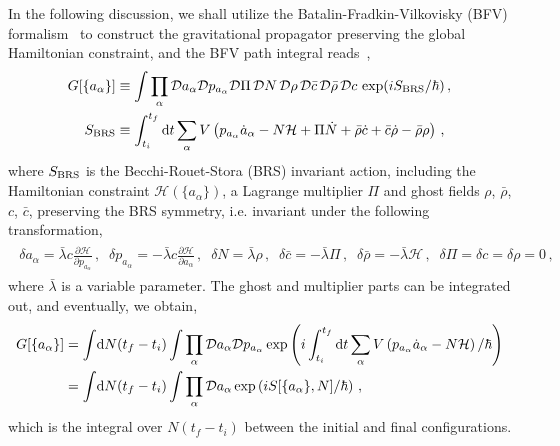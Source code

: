\documentclass[superscriptaddress,aps,preprintnumbers,nofootinbib]{revtex4-2}
\begin{document}
In the following discussion, we shall utilize the Batalin-Fradkin-Vilkovisky (BFV) formalism~\cite{Fradkin:1975cq,Batalin:1977pb} to construct the gravitational propagator preserving the global Hamiltonian constraint, and the BFV path integral reads~\cite{Halliwell:1988wc},
\begin{align}
G[\{a_{\alpha}\}]&\equiv \int \prod_{\alpha} \mathcal{D}a_{\alpha}\mathcal{D}p_{a_{\alpha}}\mathcal{D}\Pi\,\mathcal{D}N\,\mathcal{D}\rho\,\mathcal{D}\bar{c}\,\mathcal{D}\bar\rho\,\mathcal{D}c\,\exp(iS_{\rm BRS}/\hbar)\,,\\
S_{\rm BRS}&\equiv \int_{t_i}^{t_f} {\rm d}t 
\sum_{\alpha}V \left(p_{a_{\alpha}}\dot{a}_{\alpha}- N \mathcal{H} + \Pi \dot{N} +\bar\rho\dot{c} +\bar{c}\dot\rho-\bar\rho\rho\right)\,,
\end{align}
where $S_{\rm BRS}$ is the Becchi-Rouet-Stora (BRS) invariant action, including the Hamiltonian constraint $\mathcal{H}(\{a_{\alpha}\})$, a Lagrange multiplier $\Pi$ and ghost fields $\rho$, $\bar{\rho}$, $c$, $\bar{c}$, preserving the BRS symmetry, i.e. invariant under the following transformation,
\begin{align}
\begin{split}
\delta a_{\alpha}=\bar{\lambda} c\frac{\partial \mathcal{H} }{\partial p_{a_{\alpha}}}\,,\;\;\delta p_{a_{\alpha}}=-\bar{\lambda} c\frac{\partial \mathcal{H} }{\partial a_{\alpha}}\,,\;\;
\delta N= \bar{\lambda}\rho\,,\;\;
\delta\bar{c}=-\bar{\lambda}\Pi\,,\;\;\delta\bar\rho=-\bar{\lambda}\mathcal{H} \,,\;\; \delta \Pi=\delta c=\delta \rho=0\,,
\end{split}
\end{align}
where $\bar{\lambda}$ is a variable parameter. The ghost and multiplier parts can be integrated out, and eventually, we obtain,
\begin{align}\label{G-propagator}
G[\{a_{\alpha}\}] &= \int \! \mathrm{d}N(t_f-t_i)
\int \prod_{\alpha} \mathcal{D}a_{\alpha}\mathcal{D}p_{a_{\alpha}}\exp\left(i \int_{t_i}^{t_f} {\rm d}t \sum_{\alpha}V \left(p_{a_{\alpha}}\dot{a}_{\alpha} - N \mathcal{H}\right)/ \hbar\right)\nonumber
\\& = \int\! \mathrm{d}N(t_f-t_i) \int 
\prod_{\alpha} \mathcal{D}a_{\alpha} \exp\left(i S[\{a_{\alpha}\},N]
/ \hbar\right)\,,
\end{align}
which is the integral over $N(t_f-t_i)$ between the initial and final configurations. 
\end{document}
